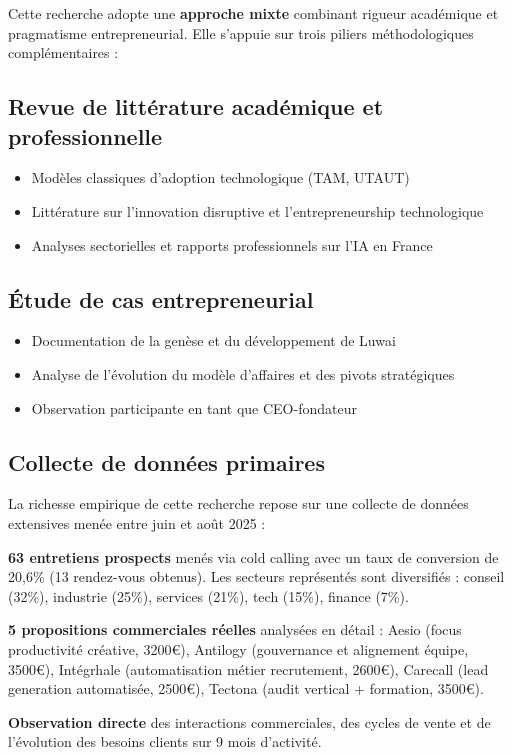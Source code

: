 \documentclass[12pt,a4paper]{report}
\begin{document}
Cette recherche adopte une \textbf{approche mixte} combinant rigueur académique et pragmatisme entrepreneurial. Elle s'appuie sur trois piliers méthodologiques complémentaires :

\subsection{Revue de littérature académique et professionnelle}
\begin{itemize}
\item Modèles classiques d'adoption technologique (TAM, UTAUT)
\item Littérature sur l'innovation disruptive et l'entrepreneurship technologique
\item Analyses sectorielles et rapports professionnels sur l'IA en France
\end{itemize}

\subsection{Étude de cas entrepreneurial}
\begin{itemize}
\item Documentation de la genèse et du développement de Luwai
\item Analyse de l'évolution du modèle d'affaires et des pivots stratégiques
\item Observation participante en tant que CEO-fondateur
\end{itemize}

\subsection{Collecte de données primaires}
La richesse empirique de cette recherche repose sur une collecte de données extensives menée entre juin et août 2025 :

\textbf{63 entretiens prospects} menés via cold calling avec un taux de conversion de 20,6\% (13 rendez-vous obtenus). Les secteurs représentés sont diversifiés : conseil (32\%), industrie (25\%), services (21\%), tech (15\%), finance (7\%).

\textbf{5 propositions commerciales réelles} analysées en détail : Aesio (focus productivité créative, 3200€), Antilogy (gouvernance et alignement équipe, 3500€), Intégrhale (automatisation métier recrutement, 2600€), Carecall (lead generation automatisée, 2500€), Tectona (audit vertical + formation, 3500€).

\textbf{Observation directe} des interactions commerciales, des cycles de vente et de l'évolution des besoins clients sur 9 mois d'activité.
\end{document}
